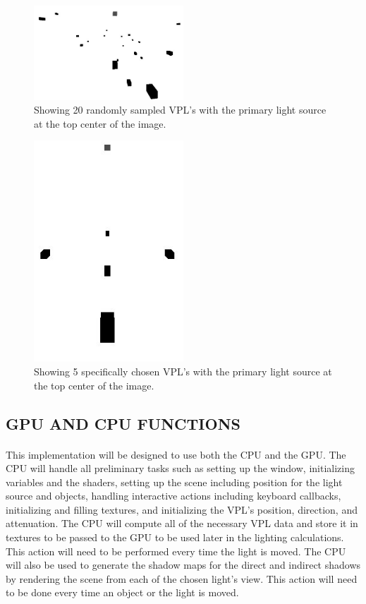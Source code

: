 \begin{figure}[h!]
  \centering
    \includegraphics[width=0.5\textwidth]{20randomVPLs.jpg}
  	\caption{Showing 20 randomly sampled VPL's with the primary light source at the top center of the image.}
	\label{fig:20randomVPLs}
\end{figure}

\begin{figure}[h!]
  \centering
    \includegraphics[width=0.5\textwidth]{5specificVPLs.jpg}
  	\caption{Showing 5 specifically chosen VPL's with the primary light source at the top center of the image.}
	\label{fig:5specificVPLs}
\end{figure}

\subsection{GPU AND CPU FUNCTIONS}
\paragraph{}
This implementation will be designed to use both the CPU and the GPU.  The CPU will handle all preliminary tasks such as setting up the window, initializing variables and the shaders, setting up the scene including position for the light source and objects, handling interactive actions including keyboard callbacks, initializing and filling textures, and initializing the VPL's position, direction, and attenuation.  The CPU will compute all of the necessary VPL data and store it in textures to be passed to the GPU to be used later in the lighting calculations.  This action will need to be performed every time the light is moved.  The CPU will also be used to generate the shadow maps for the direct and indirect shadows by rendering the scene from each of the chosen light's view.  This action will need to be done every time an object or the light is moved.

